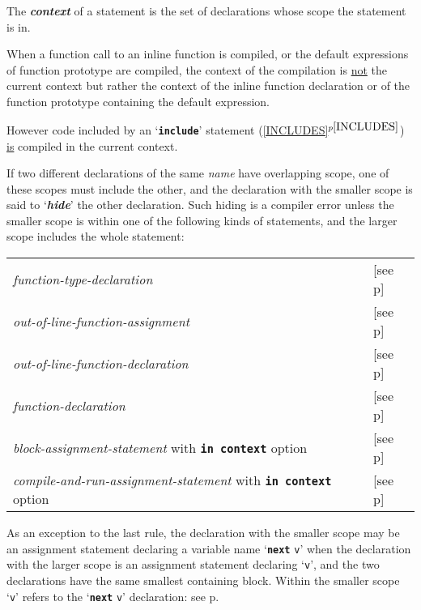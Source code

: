 \documentclass[12pt]{article}
\newcommand{\TT}[1]{{\tt \bfseries #1}}
\newcommand{\key}[1]{{\bf \em #1}\index{#1}}
\newcommand{\mkey}[2]{{\bf \em #1}\index{#1!#2}}
\newcommand{\itemref}[1]{\ref{#1}$^{p\pageref{#1}}$}
\newcommand{\pagref}[1]{p\pageref{#1}}
\begin{document}
The \key{context}\label{CONTEXT} of a statement is the set of declarations
whose scope the statement is in.

When a function call to an inline function is compiled, or the
default expressions of function prototype are compiled,
the context of the compilation is \underline{not} the current context but
rather the context of the inline function declaration or of the function
prototype containing the default expression.

However code included by an `\TT{include}' statement
(\itemref{INCLUDES}) \underline{is} compiled in the current context.

If two different declarations of the same {\em name} have overlapping
scope, one of these scopes must include the other,
and the declaration with the smaller scope is said to 
`\mkey{hide}{declaration}'\label{HIDE} the other declaration.
Such hiding is a compiler error unless the smaller scope
is within one of the following kinds of statements, and
the larger scope includes the whole statement:
\begin{center}
\begin{tabular}{ll}
{\em function-type-declaration}
    & [see \pagref{FUNCTION-TYPE-DECLARATION}] \\
{\em out-of-line-function-assignment}
    & [see \pagref{OUT-OF-LINE-FUNCTION-ASSIGNMENT}] \\
{\em out-of-line-function-declaration}
    & [see \pagref{OUT-OF-LINE-FUNCTION-DECLARATION}] \\
{\em function-declaration}
    & [see \pagref{FUNCTION-DECLARATION}] \\
{\em block-assignment-statement} with \TT{in context} option
    & [see \pagref{BLOCK-ASSIGNMENT-STATEMENTS}] \\
{\em compile-and-run-assignment-statement} with \TT{in context} option
    & [see \pagref{COMPILE-AND-RUN-ASSIGNMENT-STATEMENTS}] \\
\end{tabular}
\end{center}

As an exception to the last rule, the declaration with the
smaller scope may be an assignment statement declaring
a variable name `\TT{next} {\tt v}' when the declaration
with the larger scope is an assignment statement
declaring `{\tt v}', and the two declarations have the
same smallest containing block.
Within the smaller scope `{\tt v}' refers to the
`\TT{next} {\tt v}' declaration: see \pagref{NEXT}.
\end{document}
